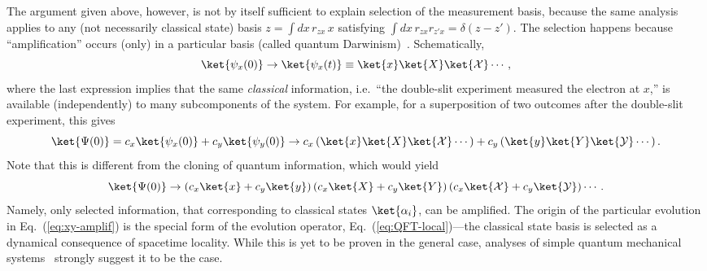 \documentclass[12pt]{article}
\begin{document}
The argument given above, however, is not by itself sufficient to 
explain selection of the measurement basis, because the same analysis 
applies to any (not necessarily classical state) basis $z = \int\!dx\, 
r_{zx}\, x$ satisfying $\int\!dx\, r_{zx} r_{z'x} = \delta(z-z')$.  The 
selection happens because ``amplification'' occurs (only) in a particular 
basis (called quantum Darwinism)~\cite{q-Darwinism}.  Schematically,
%
\begin{equation}
  \ket{\psi_x(0)} \rightarrow \ket{\psi_x(t)} 
  \equiv \ket{x} \ket{X} \ket{\cal X} \cdots,
\label{eq:x-amplif}
\end{equation}
%
where the last expression implies that the same {\it classical} information, 
i.e.\ ``the double-slit experiment measured the electron at $x$,'' is 
available (independently) to many subcomponents of the system.  For 
example, for a superposition of two outcomes after the double-slit 
experiment, this gives
%
\begin{equation}
  \ket{\Psi(0)} = c_x \ket{\psi_x(0)} + c_y \ket{\psi_y(0)}
  \rightarrow c_x \left( \ket{x} \ket{X} \ket{\cal X} \cdots \right) 
    + c_y \left( \ket{y} \ket{Y} \ket{\cal Y} \cdots \right).
\label{eq:xy-amplif}
\end{equation}
%
Note that this is different from the cloning of quantum information, 
which would yield
%
\begin{equation}
  \ket{\Psi(0)} 
  \rightarrow \left( c_x \ket{x} + c_y \ket{y} \right) 
    \left( c_x \ket{X} + c_y \ket{Y} \right) 
    \left( c_x \ket{\cal X} + c_y \ket{\cal Y} \right) \cdots.
\label{eq:xy-copy}
\end{equation}
%
Namely, only selected information, that corresponding to classical 
states $\ket{\alpha_i}$, can be amplified.  The origin of the particular 
evolution in Eq.~(\ref{eq:xy-amplif}) is the special form of the 
evolution operator, Eq.~(\ref{eq:QFT-local})---the classical state 
basis is selected as a dynamical consequence of spacetime locality. 
While this is yet to be proven in the general case, analyses of simple 
quantum mechanical systems~\cite{q-Darwinism} strongly suggest it 
to be the case.
\end{document}
